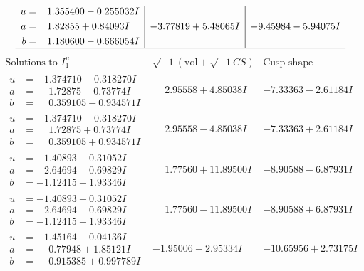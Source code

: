 \documentclass[1p]{elsarticle_modified}
\theoremstyle{definition}
\newcommand{\I}{\sqrt{-1}}
\begin{document}
$$\begin{array}{c|c|c}
\begin{aligned}
u &= \phantom{-}1.355400 - 0.255032 I \\
a &= \phantom{-}1.82855 + 0.84093 I \\
b &= \phantom{-}1.180600 - 0.666054 I\end{aligned}
 & -3.77819 + 5.48065 I & -9.45984 - 5.94075 I\\
 \hline 
 \end{array}$$\newpage$$\begin{array}{c|c|c}  
\text{Solutions to }I^u_{1}& \I (\text{vol} + \sqrt{-1}CS) & \text{Cusp shape}\\
 \hline 
\begin{aligned}
u &= -1.374710 + 0.318270 I \\
a &= \phantom{-}1.72875 - 0.73774 I \\
b &= \phantom{-}0.359105 - 0.934571 I\end{aligned}
 & \phantom{-}2.95558 + 4.85038 I & -7.33363 - 2.61184 I \\ \hline\begin{aligned}
u &= -1.374710 - 0.318270 I \\
a &= \phantom{-}1.72875 + 0.73774 I \\
b &= \phantom{-}0.359105 + 0.934571 I\end{aligned}
 & \phantom{-}2.95558 - 4.85038 I & -7.33363 + 2.61184 I \\ \hline\begin{aligned}
u &= -1.40893 + 0.31052 I \\
a &= -2.64694 + 0.69829 I \\
b &= -1.12415 + 1.93346 I\end{aligned}
 & \phantom{-}1.77560 + 11.89500 I & -8.90588 - 6.87931 I \\ \hline\begin{aligned}
u &= -1.40893 - 0.31052 I \\
a &= -2.64694 - 0.69829 I \\
b &= -1.12415 - 1.93346 I\end{aligned}
 & \phantom{-}1.77560 - 11.89500 I & -8.90588 + 6.87931 I \\ \hline\begin{aligned}
u &= -1.45164 + 0.04136 I \\
a &= \phantom{-}0.77948 + 1.85121 I \\
b &= \phantom{-}0.915385 + 0.997789 I\end{aligned}
 & -1.95006 - 2.95334 I & -10.65956 + 2.73175 I \\ \hline\begin{aligned}

\end{aligned}
\end{array}$$
\end{document}
